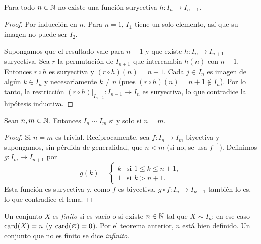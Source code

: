 \begin{lemma}
  Para todo \(n \in \mathbb{N}\) no existe una función suryectiva \(h\colon I_n \to I_{n+1}\).
\end{lemma}

\begin{proof}
  Por inducción en \(n\). Para \(n = 1\), \(I_1\) tiene un solo elemento, así que su imagen no puede ser \(I_2\).

  Supongamos que el resultado vale para \(n - 1\) y que existe \(h\colon I_n \to I_{n+1}\) suryectiva. Sea \(r\) la permutación de \(I_{n+1}\) que intercambia \(h(n)\) con \(n + 1\). Entonces \(r \circ h\) es suryectiva y \((r \circ h)(n) = n + 1\). Cada \(j \in I_n\) es imagen de algún \(k \in I_n\) y necesariamente \(k \neq n\) (pues \((r \circ h)(n) = n + 1 \notin I_n\)). Por lo tanto, la restricción \((r \circ h)|_{I_{n-1}}\colon I_{n-1} \to I_n\) es suryectiva, lo que contradice la hipótesis inductiva.
\end{proof}

\begin{theorem}
  Sean \(n, m \in \mathbb{N}\). Entonces \(I_n \sim I_m\) si y solo si \(n = m\).
\end{theorem}

\begin{proof}
  Si \(n = m\) es trivial. Recíprocamente, sea \(f\colon I_n \to I_m\) biyectiva y supongamos, sin pérdida de generalidad, que \(n < m\) (si no, se usa \(f^{-1}\)). Definimos \(g\colon I_m \to I_{n+1}\) por
  \[
    g(k) =
    \begin{cases}
      k & \text{si } 1 \leq k \leq n + 1, \\
      1 & \text{si } k > n + 1.
    \end{cases}
  \]
  Esta función es suryectiva y, como \(f\) es biyectiva, \(g \circ f\colon I_n \to I_{n+1}\) también lo es, lo que contradice el lema.
\end{proof}

\begin{definition}
  Un conjunto \(X\) es \emph{finito} si es vacío o si existe \(n \in \mathbb{N}\) tal que \(X \sim I_n\); en ese caso \(\operatorname{card}(X) = n\) (y \(\operatorname{card}(\varnothing) = 0\)). Por el teorema anterior, \(n\) está bien definido. Un conjunto que no es finito se dice \emph{infinito}.
\end{definition}
